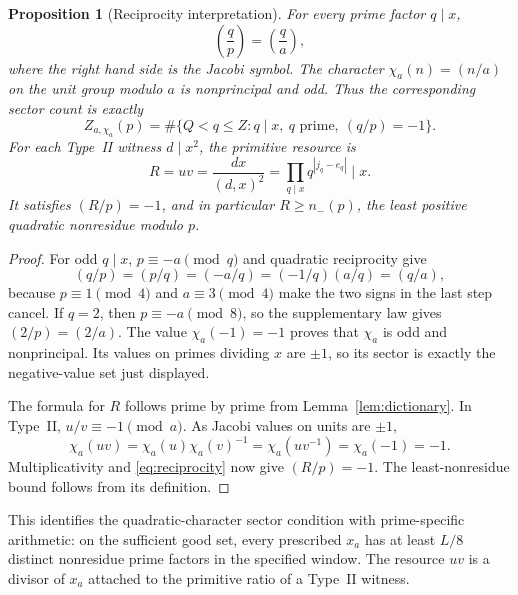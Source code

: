 \documentclass[11pt]{article}
\newtheorem{proposition}[theorem]{Proposition}
\theoremstyle{remark}\newtheorem{remark}[theorem]{Remark}
\begin{document}
\begin{proposition}[Reciprocity interpretation]\label{prop:resource}
For every prime factor $q\mid x$,
\begin{equation}\label{eq:reciprocity}
 \left(\frac q p\right)=\left(\frac q a\right),
\end{equation}
where the right hand side is the Jacobi symbol. The character
$\chi_a(n)=(n/a)$ on the unit group modulo $a$ is nonprincipal and odd.
Thus the corresponding sector count is exactly
\[
 Z_{a,\chi_a}(p)=
 \#\{Q<q\le Z:q\mid x,\ q\text{ prime},\ (q/p)=-1\}.
\]
For each Type~II witness $d\mid x^2$, the primitive resource is
\[
 R=uv=\frac{dx}{(d,x)^2}
      =\prod_{q\mid x}q^{|j_q-e_q|}\mid x.
\]
It satisfies $(R/p)=-1$, and in particular
$R\ge n_-(p)$, the least positive quadratic nonresidue modulo $p$.
\end{proposition}
\begin{proof}
For odd $q\mid x$, $p\equiv-a\pmod q$ and quadratic reciprocity give
\[
 (q/p)=(p/q)=(-a/q)
 =(-1/q)(a/q)=(q/a),
\]
because $p\equiv1\pmod4$ and $a\equiv3\pmod4$ make the two signs
in the last step cancel. If $q=2$, then $p\equiv-a\pmod8$, so the
supplementary law gives $(2/p)=(2/a)$.
The value $\chi_a(-1)=-1$ proves that $\chi_a$ is odd and nonprincipal.
Its values on primes dividing $x$ are $\pm1$, so its sector is exactly
the negative-value set just displayed.

The formula for $R$ follows prime by prime from
Lemma~\ref{lem:dictionary}. In Type~II, $u/v\equiv-1\pmod a$.
As Jacobi values on units are $\pm1$,
\[
 \chi_a(uv)=\chi_a(u)\chi_a(v)^{-1}
          =\chi_a(uv^{-1})=\chi_a(-1)=-1.
\]
Multiplicativity and \eqref{eq:reciprocity} now give $(R/p)=-1$.
The least-nonresidue bound follows from its definition.
\end{proof}

This identifies the quadratic-character sector condition with
prime-specific arithmetic: on the sufficient good set, every prescribed
$x_a$ has at least $L/8$ distinct nonresidue prime factors in the
specified window. The resource $uv$ is a divisor of $x_a$ attached to the primitive
ratio of a Type~II witness.
\end{document}
